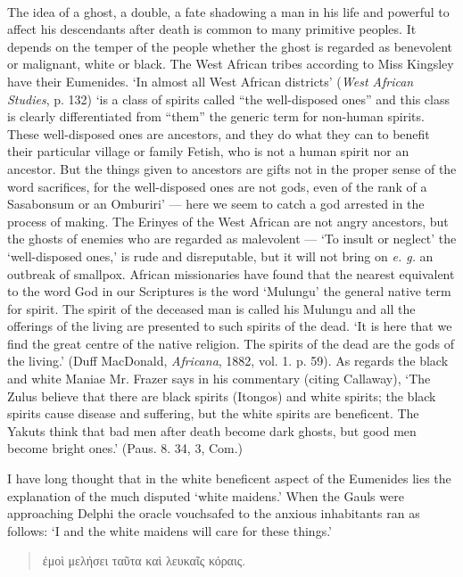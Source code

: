 \documentclass[a4paper, 11pt, oneside, polutonikogreek, english]{article}
\begin{document}
\paragraph{}
The idea of a ghost, a double, a fate shadowing a man in his life and powerful to affect his descendants after death is common to many primitive peoples. It depends on the temper of the people whether the ghost is regarded as benevolent or malignant, white or black. The West African tribes according to Miss Kingsley have their Eumenides. `In almost all West African districts' (\emph{West African Studies}, p. 132) `is a class of spirits called ``the well-disposed ones'' and this class is clearly differentiated from ``them'' the generic term for non-human spirits. These well-disposed ones are ancestors, and they do what they can to benefit their particular village or family Fetish, who is not a human spirit nor an ancestor. But the things given to ancestors are gifts not in the proper sense of the word sacrifices, for the well-disposed ones are not gods, even of the rank of a Sasabonsum or an Omburiri' --- here we seem to catch a god arrested in the process of making. The Erinyes of the West African are not angry ancestors, but the ghosts of enemies who are regarded as malevolent --- `To insult or neglect' the `well-disposed ones,' is rude and disreputable, but it will not bring on \emph{e. g.} an outbreak of smallpox. African missionaries have found that the nearest equivalent to the word God in our Scriptures is the word `Mulungu' the general native term for spirit. The spirit of the deceased man is called his Mulungu and all the offerings of the living are presented to such spirits of the dead. `It is here that we find the great centre of the native religion. The spirits of the dead are the gods of the living.' (Duff MacDonald, \emph{Africana}, 1882, vol. 1. p. 59). As regards the black and white Maniae Mr. Frazer says in his commentary (citing Callaway), `The Zulus believe that there are black spirits (Itongos) and white spirits; the black spirits cause disease and suffering, but the white spirits are beneficent. The Yakuts think that bad men after death become dark ghosts, but good men become bright ones.' (Paus. 8. 34, 3, Com.)

I have long thought that in the white beneficent aspect of the Eumenides lies the explanation of the much disputed `white maidens.' When the Gauls were approaching Delphi the oracle vouchsafed to the anxious inhabitants ran as follows: `I and the white maidens will care for these things.'
\begin{quotation}
\large
ἐμοὶ μελήσει ταῦτα καὶ λευκαῖς κόραις.
\end{quotation}
\end{document}
